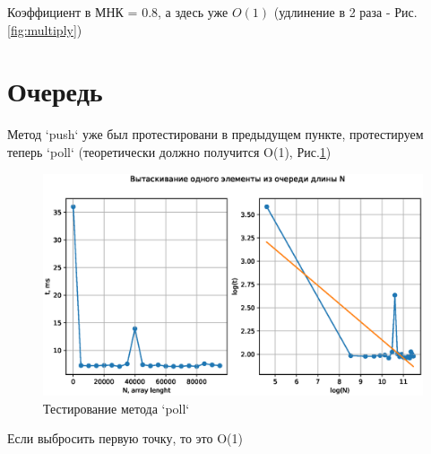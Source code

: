 \documentclass[a4paper, 12pt]{report}
\renewcommand{\figurename}{Рис.}
\begin{document}
	Коэффициент в МНК = 0.8, а здесь уже $O(1)$ (удлинение в 2 раза - \figurename \ref{fig:multiply})
	\section*{Очередь}
	Метод `push` уже был протестировани в предыдущем пункте, протестируем теперь `poll` (теоретически должно получится O(1), \figurename \ref{fig:poll})
	
	\begin{figure}[h]
		\centering
		\includegraphics[width=0.6\linewidth]{./queue/poll.eps}
		\caption{Тестирование метода `poll`}
		\label{fig:poll}
	\end{figure}

	Если выбросить первую точку, то это O(1)
\end{document}
